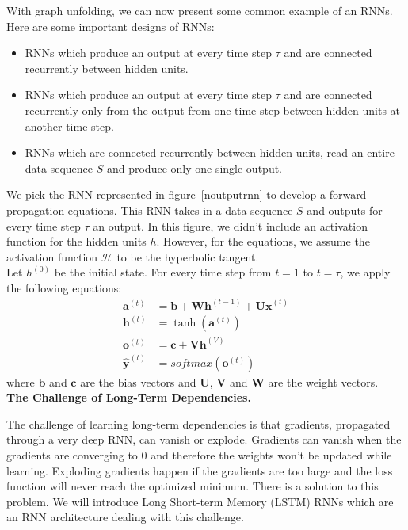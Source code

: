 
With graph unfolding, we can now present some common example of an RNNs. Here are
some important designs of RNNs:
\begin{itemize}
  \item RNNs which produce an output at every time step $\tau$ and are connected
    recurrently between hidden units.
  \item RNNs which produce an output at every time step $\tau$ and are connected
    recurrently only from the output from one time step between hidden units at
    another time step.
  \item RNNs which are connected recurrently between hidden units, read an
    entire data sequence $S$ and produce only one single output.
\end{itemize}



We pick the RNN represented in figure~\ref{noutputrnn} to develop a forward
propagation equations. This RNN takes in a data sequence $S$ and outputs for
every time step $\tau$ an output. In this figure, we didn't include an
activation function for the hidden units $h$. However, for the equations, we
assume the activation function $\mathcal{H}$ to be the hyperbolic tangent.\\

Let $h^{(0)}$ be the initial state. For every time step from $t = 1$ to $t =
\tau$, we apply the following equations:
  \begin{align}
    \bm{a}^{(t)} & = \bm{b} + \bm{Wh}^{(t-1)} + \bm{Ux}^{(t)} \\
    \bm{h}^{(t)} & = \tanh(\bm{a}^{(t)}) \\
    \bm{o}^{(t)} & = \bm c + \bm{Vh}^{(V)} \\
    \bm{\hat y}^{(t)} & = softmax(\bm o^{(t)})
  \end{align}
where $\bm b$ and $\bm c$ are the bias vectors and $\bm U$, $\bm V$ and $\bm W$ are
the weight vectors.\\


\textbf{The Challenge of Long-Term Dependencies.} 

The challenge of learning long-term dependencies is that gradients, propagated
through a very deep RNN, can vanish or explode. Gradients can vanish when the
gradients are converging to $0$ and therefore the weights won't be updated while
learning. Exploding gradients happen if the gradients are too large and the loss
function will never reach the optimized minimum. There is a solution to this
problem. We will introduce Long Short-term Memory (LSTM) RNNs which are an RNN
architecture dealing with this challenge.\cite{doi:10.1162/neco.1997.9.8.1735}
